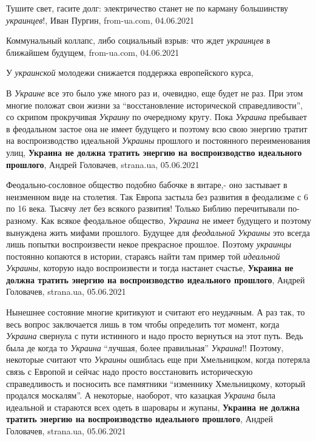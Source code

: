 Тушите свет, гасите долг: электричество станет не по карману большинству \emph{украинцев}!,
Иван Пургин, from-ua.com, 04.06.2021

Коммунальный коллапс, либо социальный взрыв: что ждет \emph{украинцев} в ближайшем будущем,
from-ua.com, 04.06.2021

У \emph{украинской} молодежи снижается поддержка европейского курса,

В \emph{Украине} все это было уже много раз и, очевидно, еще будет не раз. При этом
многие положат свои жизни за \enquote{восстановление исторической
справедливости}, со скрипом прокручивая \emph{Украину} по очередному кругу.  Пока
\emph{Украина} пребывает в феодальном застое она не имеет будущего и поэтому всю свою
энергию тратит на воспроизводство идеальной \emph{Украины} прошлого и постоянного
переименования улиц,
\textbf{Украина не должна тратить энергию на воспроизводство идеального прошлого},
Андрей Головачев, strana.ua, 05.06.2021

Феодально-сословное общество подобно бабочке в янтаре,- оно застывает в
неизменном виде на столетия. Так Европа застыла без развития в феодализме с 6
по 16 века. Тысячу лет без всякого развития! Только Библию перечитывали
по-разному. Как всякое феодальное общество, \emph{Украина} не имеет будущего и поэтому
вынуждена жить мифами прошлого. Будущее для \emph{феодальной Украины} это всегда лишь
попытки воспроизвести некое прекрасное прошлое. Поэтому \emph{украинцы} постоянно
копаются в истории, стараясь найти там пример той \emph{идеальной Украины}, которую
надо воспроизвести и тогда настанет счастье,
\textbf{Украина не должна тратить энергию на воспроизводство идеального прошлого},
Андрей Головачев, strana.ua, 05.06.2021

Нынешнее состояние многие критикуют и считают его неудачным. А раз так, то весь
вопрос заключается лишь в том чтобы определить тот момент, когда \emph{Украина}
свернула с пути истинного и надо просто вернуться на этот путь. Ведь была де
когда то \emph{Украина} \enquote{лучшая, более правильная} \emph{Украина}!!  Поэтому, некоторые
считают что \emph{Украины} ошиблась еще при Хмельницком, когда потеряла связь с
Европой и сейчас надо просто восстановить историческую справедливость и
посносить все памятники \enquote{изменнику Хмельницкому, который продался москалям}. А
некоторые, наоборот, что казацкая \emph{Украина} была идеальной и стараются всех
одеть в шаровары и жупаны,
\textbf{Украина не должна тратить энергию на воспроизводство идеального прошлого},
Андрей Головачев, strana.ua, 05.06.2021

